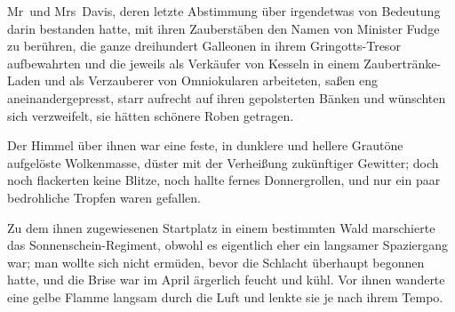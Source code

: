 Mr~und Mrs~Davis, deren letzte Abstimmung über irgendetwas von Bedeutung darin bestanden hatte, mit ihren Zauberstäben den Namen von Minister Fudge zu berühren, die ganze dreihundert Galleonen in ihrem Gringotts-Tresor aufbewahrten und die jeweils als Verkäufer von Kesseln in einem Zaubertränke-Laden und als Verzauberer von Omniokularen arbeiteten, saßen eng aneinandergepresst, starr aufrecht auf ihren gepolsterten Bänken und wünschten sich verzweifelt, sie hätten schönere Roben getragen.

Der Himmel über ihnen war eine feste, in dunklere und hellere Grautöne aufgelöste Wolkenmasse, düster mit der Verheißung zukünftiger Gewitter; doch noch flackerten keine Blitze, noch hallte fernes Donnergrollen, und nur ein paar bedrohliche Tropfen waren gefallen.

\later

Zu dem ihnen zugewiesenen Startplatz in einem bestimmten Wald marschierte das Sonnenschein-Regiment, obwohl es eigentlich eher ein langsamer Spaziergang war; man wollte sich nicht ermüden, bevor die Schlacht überhaupt begonnen hatte, und die Brise war im April ärgerlich feucht und kühl. Vor ihnen wanderte eine gelbe Flamme langsam durch die Luft und lenkte sie je nach ihrem Tempo.

